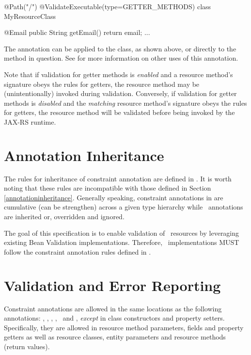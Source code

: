 \begin{listing}{1}
@Path("/")
@ValidateExecutable(type=GETTER_METHODS)
class MyResourceClass {

  @Email
  public String getEmail() {
    return email;
  }
  ...
}
\end{listing}

The annotation  can be applied to the class, as shown above, or directly to the method in question. See \cite{bv11} for more information on other uses of this annotation.

Note that if validation for getter methods is {\em enabled} and a resource method's signature obeys the rules for getters, the resource method may be (unintentionally) invoked during validation. Conversely, if validation for getter methods is {\em disabled} and the {\em matching} resource method's signature obeys the rules for getters, the resource method will be validated before being invoked by the JAX-RS runtime.

\section{Annotation Inheritance}
\label{annotation_inheritance}

The rules for inheritance of constraint annotation are defined in \cite{bv11}. It is worth noting that these rules are incompatible with those defined in Section \ref{annotationinheritance}. Generally speaking, constraint annotations in \cite{bv11} are cumulative (can be strengthen) across a given type hierarchy while \jaxrs\ annotations are inherited or, overridden and ignored.

The goal of this specification is to enable validation of \jaxrs\ resources by leveraging existing Bean Validation implementations. Therefore, \jaxrs\ implementations MUST follow the constraint annotation rules defined in \cite{bv11}.

\section{Validation and Error Reporting}
\label{validation_and_error_reporting}

Constraint annotations are allowed in the same locations as the following annotations: \MatrixParam, \QueryParam, \PathParam, \CookieParam, \HeaderParam\ and \Context, {\em except} in class constructors and property setters. Specifically, they are allowed in resource method parameters, fields and property getters as well as resource classes, entity parameters and resource methods (return values). 

